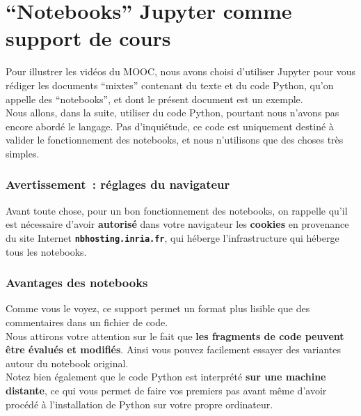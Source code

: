     \hypertarget{notebooks-jupyter-comme-support-de-cours}{%
\section{``Notebooks'' Jupyter comme support de
cours}\label{notebooks-jupyter-comme-support-de-cours}}

    Pour illustrer les vidéos du MOOC, nous avons choisi d'utiliser Jupyter
pour vous rédiger les documents ``mixtes'' contenant du texte et du code
Python, qu'on appelle des ``notebooks'', et dont le présent document est
un exemple.\\

Nous allons, dans la suite, utiliser du code Python, pourtant nous
n'avons pas encore abordé le langage. Pas d'inquiétude, ce code est
uniquement destiné à valider le fonctionnement des notebooks, et nous
n'utilisons que des choses très simples.

    \hypertarget{avertissement-ruxe9glages-du-navigateur}{%
\subsubsection{Avertissement~: réglages du
navigateur}\label{avertissement-ruxe9glages-du-navigateur}}

    Avant toute chose, pour un bon fonctionnement des notebooks, on rappelle
qu'il est nécessaire d'avoir \textbf{autorisé} dans votre navigateur les
\textbf{cookies} en provenance du site Internet
\textbf{\texttt{nbhosting.inria.fr}}, qui héberge l'infrastructure qui
héberge tous les notebooks.

    \hypertarget{avantages-des-notebooks}{%
\subsubsection{Avantages des notebooks}\label{avantages-des-notebooks}}

    Comme vous le voyez, ce support permet un format plus lisible que des
commentaires dans un fichier de code.\\

    Nous attirons votre attention sur le fait que \textbf{les fragments de
code peuvent être évalués et modifiés}. Ainsi vous pouvez facilement
essayer des variantes autour du notebook original.\\

Notez bien également que le code Python est interprété \textbf{sur une
machine distante}, ce qui vous permet de faire vos premiers pas avant
même d'avoir procédé à l'installation de Python sur votre propre
ordinateur.

